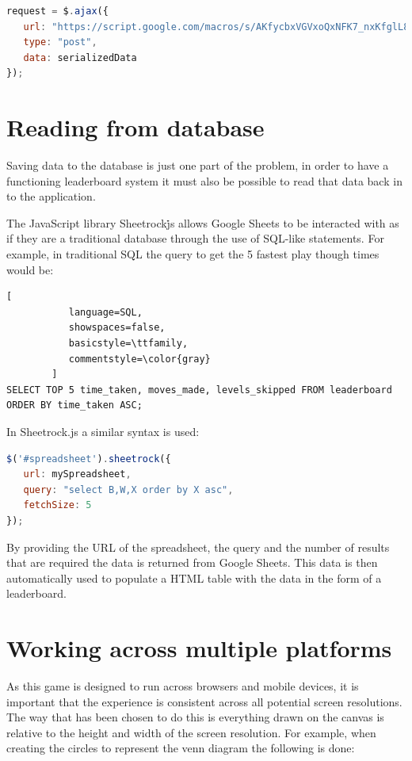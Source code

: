 \documentclass[12pt,a4paper]{report}
\begin{document}
\begin{lstlisting}[language=JavaScript]
request = $.ajax({
   url: "https://script.google.com/macros/s/AKfycbxVGVxoQxNFK7_nxKfglL8yLNUmdPwP2e9j8IMO6JY5wzLEdSE/exec",
   type: "post",
   data: serializedData
});
\end{lstlisting}

\section{Reading from database}
Saving data to the database is just one part of the problem, in order to have a functioning leaderboard system it must also be possible to read that data back in to the application.

The JavaScript library Sheetrock\.js allows Google Sheets to be interacted with as if they are a traditional database through the use of SQL-like statements.
For example, in traditional SQL the query to get the 5 fastest play though times would be:

\begin{lstlisting}[
           language=SQL,
           showspaces=false,
           basicstyle=\ttfamily,
           commentstyle=\color{gray}
        ]
SELECT TOP 5 time_taken, moves_made, levels_skipped FROM leaderboard ORDER BY time_taken ASC;
\end{lstlisting}

In Sheetrock.js a similar syntax is used:

\begin{lstlisting}[language=JavaScript]
$('#spreadsheet').sheetrock({
   url: mySpreadsheet,
   query: "select B,W,X order by X asc",
   fetchSize: 5
});
\end{lstlisting}

By providing the URL of the spreadsheet, the query and the number of results that are required the data is returned from Google Sheets. This data is then automatically used to populate a HTML table with the data in the form of a leaderboard.

\section{Working across multiple platforms}
As this game is designed to run across browsers and mobile devices, it is important that the experience is consistent across all potential screen resolutions. The way that has been chosen to do this is everything drawn on the canvas is relative to the height and width of the screen resolution. 
For example, when creating the circles to represent the venn diagram the following is done:
\end{document}
